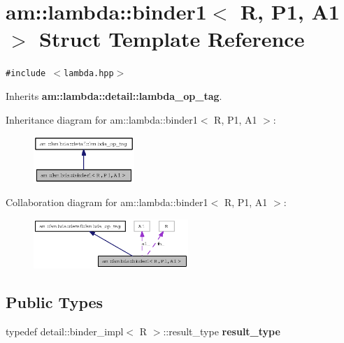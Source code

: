\section{am::lambda::binder1$<$ R, P1, A1 $>$ Struct Template Reference}
\label{structam_1_1lambda_1_1binder1}
{\tt \#include $<$lambda.hpp$>$}

Inherits {\bf am::lambda::detail::lambda\_\-op\_\-tag}.

Inheritance diagram for am::lambda::binder1$<$ R, P1, A1 $>$:\begin{figure}[H]
\begin{center}
\leavevmode
\includegraphics[width=108pt]{structam_1_1lambda_1_1binder1__inherit__graph}
\end{center}
\end{figure}
Collaboration diagram for am::lambda::binder1$<$ R, P1, A1 $>$:\begin{figure}[H]
\begin{center}
\leavevmode
\includegraphics[width=166pt]{structam_1_1lambda_1_1binder1__coll__graph}
\end{center}
\end{figure}
\subsection*{Public Types}
\begin{CompactItemize}
\item 
typedef detail::binder\_\-impl$<$ R $>$::result\_\-type \textbf{result\_\-type}\label{structam_1_1lambda_1_1binder1_9ca2fec190c6c2d883b66b4d3522c95b}

\end{CompactItemize}

